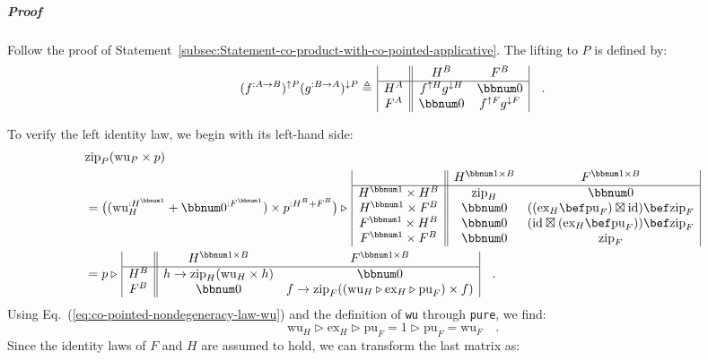 \subparagraph{Proof}

Follow the proof of Statement~\ref{subsec:Statement-co-product-with-co-pointed-applicative}.
The lifting to $P$ is defined by:
\[
(f^{:A\rightarrow B})^{\uparrow P}(g^{:B\rightarrow A})^{\downarrow P}\triangleq\,\begin{array}{|c||cc|}
 & H^{B} & F^{B}\\
\hline H^{A} & f^{\uparrow H}g^{\downarrow H} & \bbnum 0\\
F^{A} & \bbnum 0 & f^{\uparrow F}g^{\downarrow F}
\end{array}\quad.
\]

To verify the left identity law, we begin with its left-hand side:
\begin{align*}
 & \text{zip}_{P}(\text{wu}_{P}\times p)\\
 & =\big((\text{wu}_{H}^{:H^{\bbnum 1}}+\bbnum 0^{:F^{\bbnum 1}})\times p^{:H^{B}+F^{B}}\big)\triangleright\,\begin{array}{|c||cc|}
 & H^{\bbnum 1\times B} & F^{\bbnum 1\times B}\\
\hline H^{\bbnum 1}\times H^{B} & \text{zip}_{H} & \bbnum 0\\
H^{\bbnum 1}\times F^{B} & \bbnum 0 & ((\text{ex}_{H}\bef\text{pu}_{F})\boxtimes\text{id})\bef\text{zip}_{F}\\
F^{\bbnum 1}\times H^{B} & \bbnum 0 & (\text{id}\boxtimes(\text{ex}_{H}\bef\text{pu}_{F}))\bef\text{zip}_{F}\\
F^{\bbnum 1}\times F^{B} & \bbnum 0 & \text{zip}_{F}
\end{array}\\
 & =p\triangleright\,\begin{array}{|c||cc|}
 & H^{\bbnum 1\times B} & F^{\bbnum 1\times B}\\
\hline H^{B} & h\rightarrow\text{zip}_{H}(\text{wu}_{H}\times h) & \bbnum 0\\
F^{B} & \bbnum 0 & f\rightarrow\text{zip}_{F}((\text{wu}_{H}\triangleright\text{ex}_{H}\triangleright\text{pu}_{F})\times f)
\end{array}\quad.
\end{align*}
Using Eq.~(\ref{eq:co-pointed-nondegeneracy-law-wu}) and the definition
of \lstinline!wu! through \lstinline!pure!, we find:
\[
\text{wu}_{H}\triangleright\text{ex}_{H}\triangleright\text{pu}_{F}=1\triangleright\text{pu}_{F}=\text{wu}_{F}\quad.
\]
Since the identity laws of $F$ and $H$ are assumed to hold, we can
transform the last matrix as:
